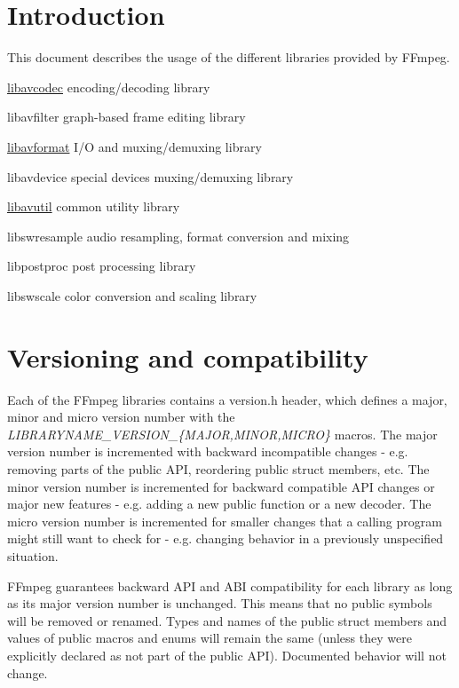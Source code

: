 \hypertarget{index_ffmpeg_intro}{}\section{Introduction}\label{index_ffmpeg_intro}
This document describes the usage of the different libraries provided by F\+Fmpeg.

\begin{DoxyItemize}
\item \hyperlink{group__libavc}{libavcodec} encoding/decoding library \item libavfilter graph-\/based frame editing library \item \hyperlink{group__libavf}{libavformat} I/O and muxing/demuxing library \item libavdevice special devices muxing/demuxing library \item \hyperlink{group__lavu}{libavutil} common utility library \item libswresample audio resampling, format conversion and mixing \item libpostproc post processing library \item libswscale color conversion and scaling library\end{DoxyItemize}
\hypertarget{index_ffmpeg_versioning}{}\section{Versioning and compatibility}\label{index_ffmpeg_versioning}
Each of the F\+Fmpeg libraries contains a version.\+h header, which defines a major, minor and micro version number with the {\itshape L\+I\+B\+R\+A\+R\+Y\+N\+A\+M\+E\+\_\+\+V\+E\+R\+S\+I\+O\+N\+\_\+\{M\+A\+J\+OR,M\+I\+N\+OR,M\+I\+C\+RO\}} macros. The major version number is incremented with backward incompatible changes -\/ e.\+g. removing parts of the public A\+PI, reordering public struct members, etc. The minor version number is incremented for backward compatible A\+PI changes or major new features -\/ e.\+g. adding a new public function or a new decoder. The micro version number is incremented for smaller changes that a calling program might still want to check for -\/ e.\+g. changing behavior in a previously unspecified situation.

F\+Fmpeg guarantees backward A\+PI and A\+BI compatibility for each library as long as its major version number is unchanged. This means that no public symbols will be removed or renamed. Types and names of the public struct members and values of public macros and enums will remain the same (unless they were explicitly declared as not part of the public A\+PI). Documented behavior will not change.


